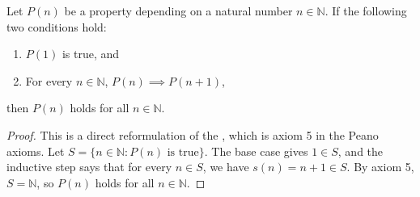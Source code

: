 \begin{proposition} \label{proposition:mathematical_induction_on_natural_numbers}
Let $P(n)$ be a property depending on a natural number $n \in \mathbb{N}$. If the following two conditions hold:
\begin{enumerate}
    \item[\textbf{(Base case)}] $P(1)$ is true, and
    \item[\textbf{(Inductive step)}] For every $n \in \mathbb{N}$, $P(n) \implies P(n+1)$,
\end{enumerate}
then $P(n)$ holds for all $n \in \mathbb{N}$.
\end{proposition}
\begin{proof}
This is a direct reformulation of the , which is axiom 5 in the Peano axioms. Let $S = \{n \in \mathbb{N} : P(n) \text{ is true}\}$. The base case gives $1 \in S$, and the inductive step says that for every $n \in S$, we have $s(n) = n+1 \in S$. By axiom 5, $S = \mathbb{N}$, so $P(n)$ holds for all $n \in \mathbb{N}$.
\end{proof}
